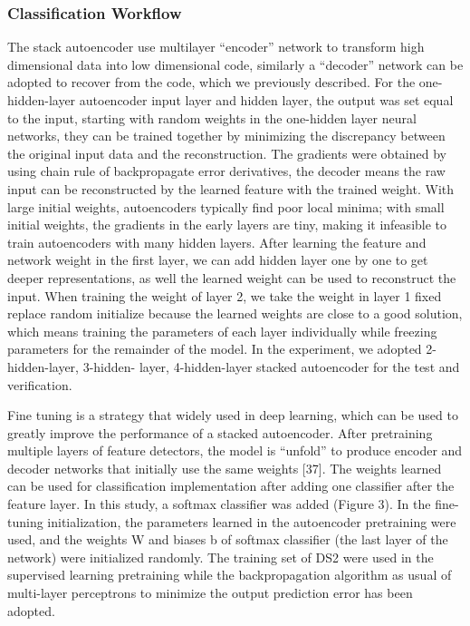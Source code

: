 \documentclass{bmcart}
\begin{document}
\subsubsection*{Classification Workflow}
The stack autoencoder use multilayer “encoder” network to transform high dimensional data into low dimensional code, similarly a “decoder” network can be adopted to recover from the code, which we previously described. For the one-hidden-layer autoencoder input layer and hidden layer, the output was set equal to the input, starting with random weights in the one-hidden layer neural networks, they can be trained together by minimizing the discrepancy between the original input data and the reconstruction. The gradients were obtained by using chain rule of backpropagate error derivatives, the decoder means the raw input can be reconstructed by the learned feature with the trained weight. With large initial weights, autoencoders typically find poor local minima; with small initial weights, the gradients in the early layers are tiny, making it infeasible to train autoencoders with many hidden layers. After learning the feature and network weight in the first layer, we can add hidden layer one by one to get deeper representations, as well the learned weight can be used to reconstruct the input. When training the weight of layer 2, we take the weight in layer 1 fixed replace random initialize because the learned weights are close to a good solution, which means training the parameters of each layer individually while freezing parameters for the remainder of the model. In the experiment, we adopted 2-hidden-layer, 3-hidden- layer, 4-hidden-layer stacked autoencoder for the test and verification.

Fine tuning is a strategy that widely used in deep learning, which can be used to greatly improve the performance of a stacked autoencoder. After pretraining multiple layers of feature detectors, the model is “unfold” to produce encoder and decoder networks that initially use the same weights [37]. The weights learned can be used for classification implementation after adding one classifier after the feature layer. In this study, a softmax classifier was added (Figure 3). In the fine-tuning initialization, the parameters learned in the autoencoder pretraining were used, and the weights W and biases b of softmax classifier (the last layer of the network) were initialized randomly. The training set of DS2 were used in the supervised learning pretraining while the backpropagation algorithm as usual of multi-layer perceptrons to minimize the output prediction error has been adopted.
\end{document}
